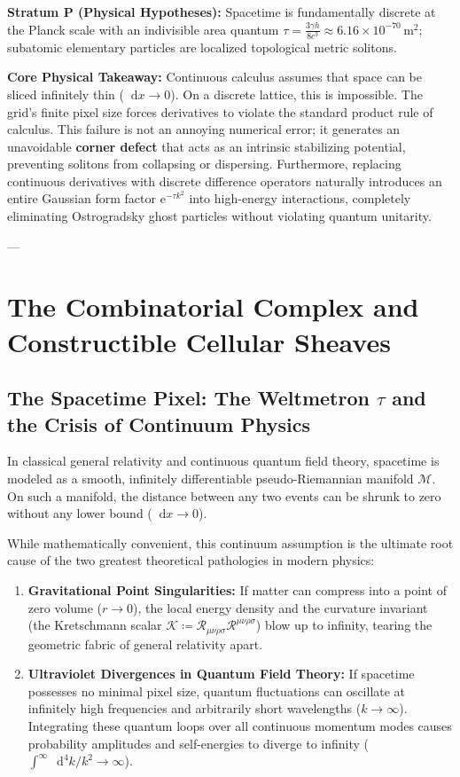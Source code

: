\documentclass[
    12pt,
    a4paper,
    headings=normal,
    twoside=false,
    open=any,
    parskip=half
]{scrbook}
\newcommand{\diff}{\mathop{}\!\mathrm{d}}
\newcommand{\eu}{\mathrm{e}}
\begin{document}
\begin{firewallbox}
\textbf{Stratum P (Physical Hypotheses):} Spacetime is fundamentally discrete at the Planck scale with an indivisible area quantum $\tau = \frac{3\gamma h}{8c^3} \approx 6.16 \times 10^{-70}\,\text{m}^2$; subatomic elementary particles are localized topological metric solitons.\par\smallskip\noindent
\textbf{Core Physical Takeaway:} Continuous calculus assumes that space can be sliced infinitely thin ($\diff x \to 0$). On a discrete lattice, this is impossible. The grid's finite pixel size forces derivatives to violate the standard product rule of calculus. This failure is not an annoying numerical error; it generates an unavoidable \textbf{corner defect} that acts as an intrinsic stabilizing potential, preventing solitons from collapsing or dispersing. Furthermore, replacing continuous derivatives with discrete difference operators naturally introduces an entire Gaussian form factor $\eu^{-\tau k^2}$ into high-energy interactions, completely eliminating Ostrogradsky ghost particles without violating quantum unitarity.
\end{firewallbox}

---

\section{The Combinatorial Complex and Constructible Cellular Sheaves}
\label{sec:ch1_cellular_sheaves_dec}

\subsection{The Spacetime Pixel: The Weltmetron $\tau$ and the Crisis of Continuum Physics}

In classical general relativity and continuous quantum field theory, spacetime is modeled as a smooth, infinitely differentiable pseudo-Riemannian manifold $\mathcal{M}$. On such a manifold, the distance between any two events can be shrunk to zero without any lower bound ($\diff x \to 0$). 

While mathematically convenient, this continuum assumption is the ultimate root cause of the two greatest theoretical pathologies in modern physics:
\begin{enumerate}[leftmargin=2em]
    \item \textbf{Gravitational Point Singularities:} If matter can compress into a point of zero volume ($r \to 0$), the local energy density and the curvature invariant (the Kretschmann scalar $\mathcal{K} \coloneqq \mathcal{R}_{\mu\nu\rho\sigma}\mathcal{R}^{\mu\nu\rho\sigma}$) blow up to infinity, tearing the geometric fabric of general relativity apart.
    \item \textbf{Ultraviolet Divergences in Quantum Field Theory:} If spacetime possesses no minimal pixel size, quantum fluctuations can oscillate at infinitely high frequencies and arbitrarily short wavelengths ($k \to \infty$). Integrating these quantum loops over all continuous momentum modes causes probability amplitudes and self-energies to diverge to infinity ($\int^\infty \diff^4 k / k^2 \to \infty$).
\end{enumerate}
\end{document}
